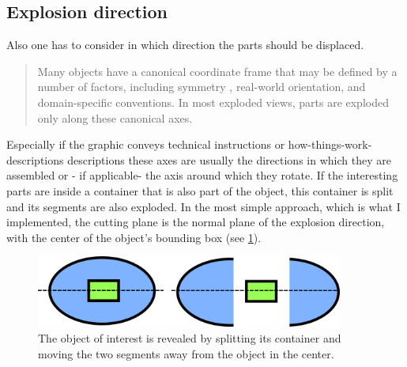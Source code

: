 \subsection{Explosion direction}
Also one has to consider in which direction the parts should be displaced. 
\begin{quote}
Many objects have a canonical coordinate frame that may be defined by a number of factors, including symmetry , real-world orientation, and domain-specific conventions. In most exploded views, parts are exploded only along these canonical axes.\cite{proc:Li:2008:AGI}
\end{quote}
Especially if the graphic conveys technical instructions or how-things-work-descriptions descriptions these axes are usually the directions in which they are assembled \cite{Agra03} or - if applicable- the axis around which they rotate\cite{MitraYYLA13}.
If the interesting parts are inside a container that is also part of the object, this container is split and its segments are also exploded. In the most simple approach, which is what I implemented, the cutting plane is the normal plane of the explosion direction, with the center of the object's bounding box (see \ref{fig:splitting}).
\begin{figure}[tb]
	\centering
	\includegraphics[width=0.9\textwidth]{chapters/figures/splitting}
	\caption{The object of interest is revealed by splitting its container and moving the two segments away from the object in the center.}
	\label{fig:splitting}
\end{figure}
